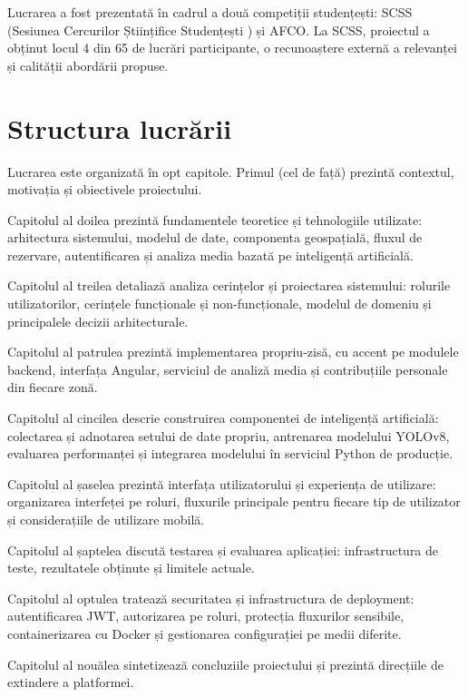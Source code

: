 Lucrarea a fost prezentată în cadrul a două competiții studențești: SCSS (Sesiunea Cercurilor Științifice Studențești ) și AFCO. La SCSS, proiectul a obținut locul 4 din 65 de lucrări participante, o recunoaștere externă a relevanței și calității abordării propuse.

\section{Structura lucrării}

Lucrarea este organizată în opt capitole. Primul (cel de față) prezintă contextul, motivația și obiectivele proiectului.

Capitolul al doilea prezintă fundamentele teoretice și tehnologiile utilizate: arhitectura sistemului, modelul de date, componenta geospațială, fluxul de rezervare, autentificarea și analiza media bazată pe inteligență artificială.

Capitolul al treilea detaliază analiza cerințelor și proiectarea sistemului: rolurile utilizatorilor, cerințele funcționale și non-funcționale, modelul de domeniu și principalele decizii arhitecturale.

Capitolul al patrulea prezintă implementarea propriu-zisă, cu accent pe modulele backend, interfața Angular, serviciul de analiză media și contribuțiile personale din fiecare zonă.

Capitolul al cincilea descrie construirea componentei de inteligență artificială: colectarea și adnotarea setului de date propriu, antrenarea modelului YOLOv8, evaluarea performanței și integrarea modelului în serviciul Python de producție.

Capitolul al șaselea prezintă interfața utilizatorului și experiența de utilizare: organizarea interfeței pe roluri, fluxurile principale pentru fiecare tip de utilizator și considerațiile de utilizare mobilă.

Capitolul al șaptelea discută testarea și evaluarea aplicației: infrastructura de teste, rezultatele obținute și limitele actuale.

Capitolul al optulea tratează securitatea și infrastructura de deployment: autentificarea JWT, autorizarea pe roluri, protecția fluxurilor sensibile, containerizarea cu Docker și gestionarea configurației pe medii diferite.

Capitolul al nouălea sintetizează concluziile proiectului și prezintă direcțiile de extindere a platformei.
